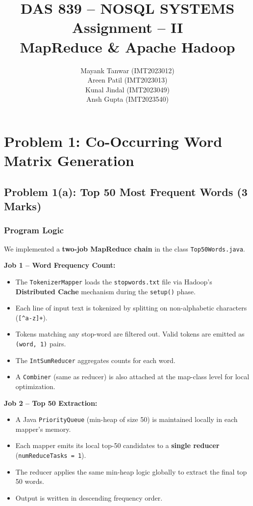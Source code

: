 \documentclass[12pt,a4paper]{article}
\title{
  \vspace{-1cm}
  \textbf{DAS 839 -- NOSQL SYSTEMS} \\[0.5em]
  \Large Assignment -- II \\[0.3em]
  \large MapReduce \& Apache Hadoop
}
\author{
  Mayank Tanwar (IMT2023012) \\
  Areen Patil (IMT2023013) \\
  Kunal Jindal (IMT2023049) \\
  Ansh Gupta (IMT2023540)
}
\date{}
\begin{document}
\maketitle

\section{Problem 1: Co-Occurring Word Matrix Generation}

\subsection{Problem 1(a): Top 50 Most Frequent Words (3 Marks)}

\subsubsection{Program Logic}
We implemented a \textbf{two-job MapReduce chain} in the class \texttt{Top50Words.java}.

\textbf{Job 1 -- Word Frequency Count:}
\begin{itemize}
  \item The \texttt{TokenizerMapper} loads the \texttt{stopwords.txt} file via Hadoop's \textbf{Distributed Cache} mechanism during the \texttt{setup()} phase.
  \item Each line of input text is tokenized by splitting on non-alphabetic characters (\texttt{[{\textasciicircum}a-z]+}).
  \item Tokens matching any stop-word are filtered out. Valid tokens are emitted as \texttt{(word, 1)} pairs.
  \item The \texttt{IntSumReducer} aggregates counts for each word.
  \item A \texttt{Combiner} (same as reducer) is also attached at the map-class level for local optimization.
\end{itemize}

\textbf{Job 2 -- Top 50 Extraction:}
\begin{itemize}
  \item A Java \texttt{PriorityQueue} (min-heap of size 50) is maintained locally in each mapper's memory.
  \item Each mapper emits its local top-50 candidates to a \textbf{single reducer} (\texttt{numReduceTasks = 1}).
  \item The reducer applies the same min-heap logic globally to extract the final top 50 words.
  \item Output is written in descending frequency order.
\end{itemize}
\end{document}
